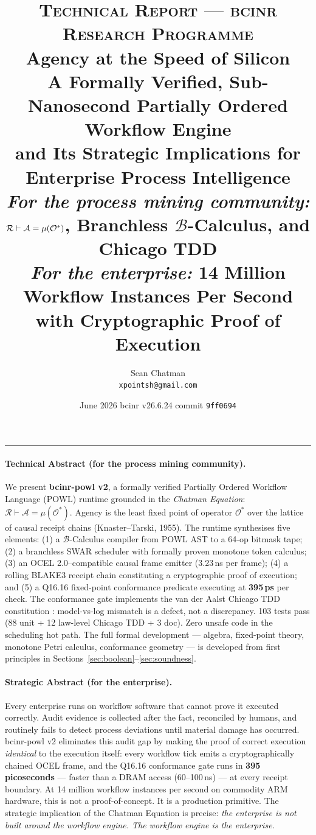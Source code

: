 \documentclass[12pt,a4paper]{article}
\title{%
  {\large\scshape Technical Report — bcinr Research Programme}\\[0.6em]
  \textbf{Agency at the Speed of Silicon}\\[0.4em]
  \large A Formally Verified, Sub-Nanosecond Partially Ordered Workflow Engine\\
  and Its Strategic Implications for Enterprise Process Intelligence\\[0.5em]
  \normalsize
  \textit{For the process mining community:}
  $\Reality \vdash \Agency = \mu(\Ostar)$,
  Branchless $\mathcal{B}$-Calculus, and Chicago TDD\\[0.2em]
  \textit{For the enterprise:}
  14 Million Workflow Instances Per Second with Cryptographic Proof of Execution
}
\author{Sean Chatman \\ \small \texttt{xpointsh@gmail.com}}
\date{June 2026 \quad\textbullet\quad bcinr v26.6.24 \quad\textbullet\quad commit \texttt{9ff0694}}
\theoremstyle{definition}
\theoremstyle{remark}
\newcommand{\Ostar}{\mathcal{O}^{*}}
\newcommand{\Agency}{\mathcal{A}}
\newcommand{\Reality}{\mathcal{R}}
\begin{document}
\maketitle
\thispagestyle{empty}

\begin{center}\rule{0.6\textwidth}{0.4pt}\end{center}

\paragraph{Technical Abstract (for the process mining community).}
We present \textbf{bcinr-powl v2}, a formally verified Partially Ordered Workflow Language
(POWL) runtime \citep{kourani2023powl} grounded in the \emph{Chatman Equation}:
$\Reality \vdash \Agency = \mu(\Ostar)$.
Agency is the least fixed point of operator $\Ostar$ over the lattice of causal receipt
chains (Knaster--Tarski, 1955).
The runtime synthesises five elements:
(1) a $\mathcal{B}$-Calculus compiler from POWL AST to a 64-op bitmask tape;
(2) a branchless SWAR scheduler with formally proven monotone token calculus;
(3) an OCEL 2.0--compatible \citep{ocel2023} causal frame emitter (3.23\,ns per frame);
(4) a rolling BLAKE3 receipt chain constituting a cryptographic proof of execution;
and (5) a Q16.16 fixed-point conformance predicate \citep{rozinat2008conformance}
executing at \textbf{395\,ps} per check.
The conformance gate implements the van der Aalst Chicago TDD constitution
\citep{vanderjest2024chicago}:
model-vs-log mismatch is a defect, not a discrepancy.
103 tests pass (88 unit + 12 law-level Chicago TDD + 3 doc).
Zero unsafe code in the scheduling hot path.
The full formal development --- algebra, fixed-point theory, monotone Petri calculus,
conformance geometry --- is developed from first principles in Sections~\ref{sec:boolean}--\ref{sec:soundness}.

\paragraph{Strategic Abstract (for the enterprise).}
Every enterprise runs on workflow software that cannot prove it executed correctly.
Audit evidence is collected after the fact, reconciled by humans, and routinely fails
to detect process deviations until material damage has occurred.
bcinr-powl v2 eliminates this audit gap by making the proof of correct execution
\emph{identical} to the execution itself:
every workflow tick emits a cryptographically chained OCEL frame,
and the Q16.16 conformance gate runs in \textbf{395 picoseconds} ---
faster than a DRAM access (60--100\,ns) ---
at every receipt boundary.
At 14 million workflow instances per second on commodity ARM hardware,
this is not a proof-of-concept.
It is a production primitive.
The strategic implication of the Chatman Equation is precise:
\emph{the enterprise is not built around the workflow engine.
The workflow engine is the enterprise.}
\end{document}
